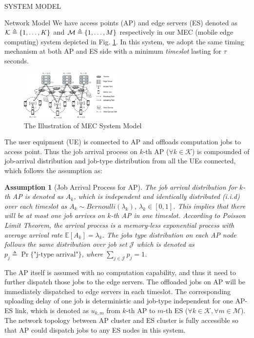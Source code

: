 \documentclass[10pt, conference, letterpaper]{IEEEtran}
\newtheorem{assumption}{Assumption}
\newcommand{\define}{\triangleq}
\DeclarePairedDelimiter{\set}{\{}{\}}
\newcommand{\apSet}{\mathcal{K}}
\newcommand{\esSet}{\mathcal{M}}
\newcommand{\jSpace}{\mathcal{J}}
\begin{document}
    \begin{section}{SYSTEM MODEL}
        \label{sec:model}
        \begin{subsection}{Network Model}
            We have access points (AP) and edge servers (ES) denoted as $\apSet \define \set{1,\dots,K}$ and $\mathcal{M} \define \set{1,\dots,M}$ respectively in our MEC (mobile edge computing) system depicted in Fig. \ref{fig:system}. In this system, we adopt the same timing mechanism at both AP and ES side with a minimum \emph{timeslot} lasting for $\tau$ seconds.

            \begin{figure}[ht]
                \centering
                \includegraphics[width=0.45\textwidth, trim={0.5cm 0.5cm 0.5cm 0.5cm}, clip]{system-model.pdf}
                \caption{The Illustration of MEC System Model}
                \label{fig:system}
            \end{figure}

            The user equipment (UE) is connected to AP and offloads computation jobs to access point. Thus the job arrival process on $k$-th AP ($\forall k\in\apSet$) is compounded of job-arrival distribution and job-type distribution from all the UEs connected, which follows the assumption as:
            \begin{assumption}[Job Arrival Process for AP]
                The job arrival distribution for $k$-th AP is denoted as $A_k$, which is independent and identically distributed (i.i.d) over each timeslot as $A_k \sim Bernoulli(\lambda_k)$, $\lambda_k\in[0,1]$. This implies that there will be at most one job arrives on $k$-th AP in one timeslot. According to \emph{Poisson Limit Theorem}, the arrival process is a memory-less exponential process with average arrival rate $\mathbb{E}[A_k]=\lambda_k$.
                The jobs type distribution on each AP node follows the same distribution over job set $\jSpace$ which is denoted as $p_j \define \Pr\{\text{"j-type arrival"}\}$, where $\sum_{j\in\jSpace} p_j=1$.
            \end{assumption}

            The AP itself is assumed with no computation capability, and thus it need to further dispatch those jobs to the edge servers.
            The offloaded jobs on AP will be immediately dispatched to edge servers in each timeslot. The corresponding uploading delay of one job is deterministic and job-type independent for one AP-ES link, which is denoted as $u_{k,m}$ from $k$-th AP to $m$-th ES ($\forall k\in\apSet, \forall m\in\esSet$).
            The network topology between AP cluster and ES cluster is fully accessible so that AP could dispatch jobs to any ES nodes in this system.


\end{subsection}
\end{section}
\end{document}
